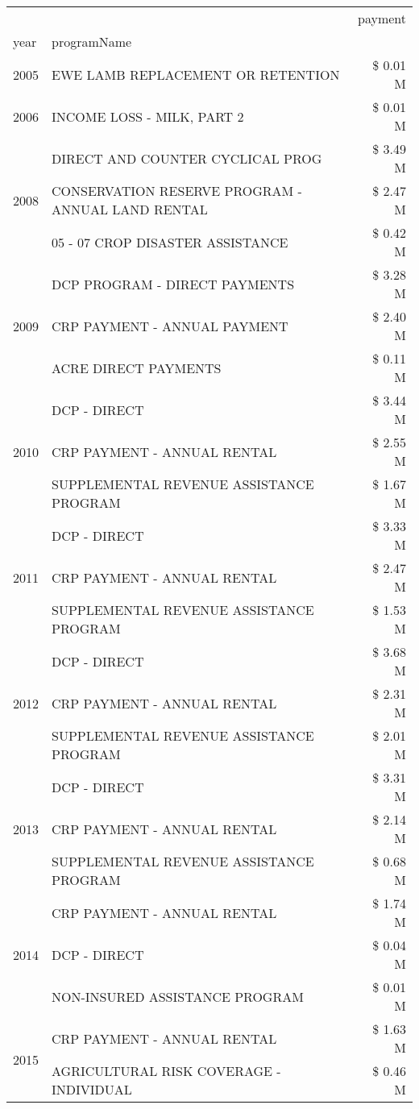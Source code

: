 \begin{tabular}{llr}
\toprule
 &  & payment \\
year & programName &  \\
\midrule
2005 & EWE LAMB REPLACEMENT OR RETENTION & \$ 0.01 M \\
\cline{1-3}
2006 & INCOME LOSS - MILK, PART 2 & \$ 0.01 M \\
\cline{1-3}
\multirow[t]{3}{*}{2008} & DIRECT AND COUNTER CYCLICAL PROG & \$ 3.49 M \\
 & CONSERVATION RESERVE PROGRAM - ANNUAL LAND RENTAL & \$ 2.47 M \\
 & 05 - 07 CROP DISASTER ASSISTANCE & \$ 0.42 M \\
\cline{1-3}
\multirow[t]{3}{*}{2009} & DCP PROGRAM - DIRECT PAYMENTS & \$ 3.28 M \\
 & CRP PAYMENT - ANNUAL PAYMENT & \$ 2.40 M \\
 & ACRE DIRECT PAYMENTS & \$ 0.11 M \\
\cline{1-3}
\multirow[t]{3}{*}{2010} & DCP - DIRECT & \$ 3.44 M \\
 & CRP PAYMENT - ANNUAL RENTAL & \$ 2.55 M \\
 & SUPPLEMENTAL REVENUE ASSISTANCE PROGRAM & \$ 1.67 M \\
\cline{1-3}
\multirow[t]{3}{*}{2011} & DCP - DIRECT & \$ 3.33 M \\
 & CRP PAYMENT - ANNUAL RENTAL & \$ 2.47 M \\
 & SUPPLEMENTAL REVENUE ASSISTANCE PROGRAM & \$ 1.53 M \\
\cline{1-3}
\multirow[t]{3}{*}{2012} & DCP - DIRECT & \$ 3.68 M \\
 & CRP PAYMENT - ANNUAL RENTAL & \$ 2.31 M \\
 & SUPPLEMENTAL REVENUE ASSISTANCE PROGRAM & \$ 2.01 M \\
\cline{1-3}
\multirow[t]{3}{*}{2013} & DCP - DIRECT & \$ 3.31 M \\
 & CRP PAYMENT - ANNUAL RENTAL & \$ 2.14 M \\
 & SUPPLEMENTAL REVENUE ASSISTANCE PROGRAM & \$ 0.68 M \\
\cline{1-3}
\multirow[t]{3}{*}{2014} & CRP PAYMENT - ANNUAL RENTAL & \$ 1.74 M \\
 & DCP - DIRECT & \$ 0.04 M \\
 & NON-INSURED ASSISTANCE PROGRAM & \$ 0.01 M \\
\cline{1-3}
\multirow[t]{3}{*}{2015} & CRP PAYMENT - ANNUAL RENTAL & \$ 1.63 M \\
 & AGRICULTURAL RISK COVERAGE - INDIVIDUAL & \$ 0.46 M \\

\end{tabular}
